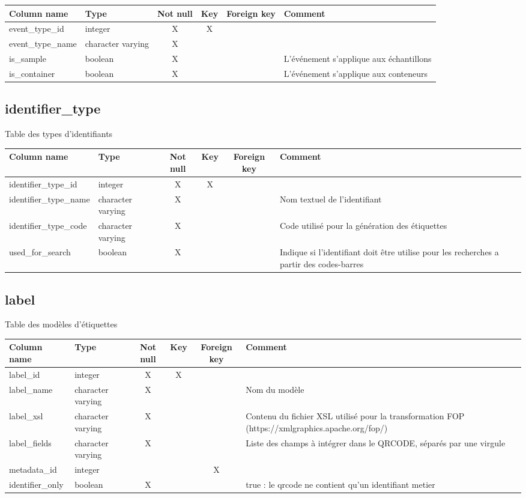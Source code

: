 \begin{tabular}{|l| p{2cm}|c|c|c| p{3cm}|}
\hline
Column name & Type & Not null & Key & Foreign key & Comment \\
\hline
event\_type\_id & integer & X & X & & \\
\hline
event\_type\_name & character varying & X & & & \\
\hline
is\_sample & boolean & X & & & L'événement s'applique aux échantillons\\
\hline
is\_container & boolean & X & & & L'événement s'applique aux conteneurs\\
\hline
\end{tabular}
\subsection{identifier\_type}
Table des types d'identifiants

\begin{tabular}{|l| p{2cm}|c|c|c| p{3cm}|}
\hline
Column name & Type & Not null & Key & Foreign key & Comment \\
\hline
identifier\_type\_id & integer & X & X & & \\
\hline
identifier\_type\_name & character varying & X & & & Nom textuel de l'identifiant\\
\hline
identifier\_type\_code & character varying & X & & & Code utilisé pour la génération des étiquettes\\
\hline
used\_for\_search & boolean & X & & & Indique si l'identifiant doit être utilise pour les recherches a partir des codes-barres\\
\hline
\end{tabular}
\subsection{label}
Table des modèles d'étiquettes

\begin{tabular}{|l| p{2cm}|c|c|c| p{3cm}|}
\hline
Column name & Type & Not null & Key & Foreign key & Comment \\
\hline
label\_id & integer & X & X & & \\
\hline
label\_name & character varying & X & & & Nom du modèle\\
\hline
label\_xsl & character varying & X & & & Contenu du fichier XSL utilisé pour la transformation FOP (https://xmlgraphics.apache.org/fop/)\\
\hline
label\_fields & character varying & X & & & Liste des champs à intégrer dans le QRCODE, séparés par une virgule\\
\hline
metadata\_id & integer & & & X & \\
\hline
identifier\_only & boolean & X & & & true : le qrcode ne contient qu'un identifiant metier\\
\hline
\end{tabular}

